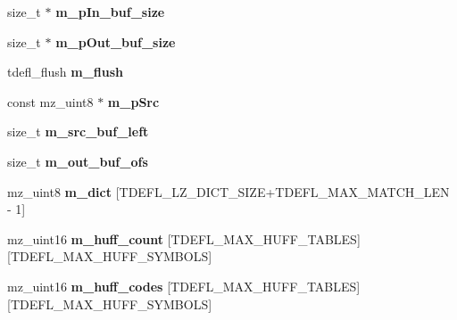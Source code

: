 \begin{DoxyCompactItemize}
size\+\_\+t $\ast$ {\bfseries m\+\_\+p\+In\+\_\+buf\+\_\+size}
\item 
\mbox{\label{structtdefl__compressor_a2629e9f8046f0d2d8898303ed6e50fbf}} 
size\+\_\+t $\ast$ {\bfseries m\+\_\+p\+Out\+\_\+buf\+\_\+size}
\item 
\mbox{\label{structtdefl__compressor_a8a3cce846b9849371735935790d8bab5}} 
tdefl\+\_\+flush {\bfseries m\+\_\+flush}
\item 
\mbox{\label{structtdefl__compressor_a2fe623583532f09b395e99e3d25c123e}} 
const mz\+\_\+uint8 $\ast$ {\bfseries m\+\_\+p\+Src}
\item 
\mbox{\label{structtdefl__compressor_a5405cb47173aa1c06cb7bb067a036f07}} 
size\+\_\+t {\bfseries m\+\_\+src\+\_\+buf\+\_\+left}
\item 
\mbox{\label{structtdefl__compressor_a9450656373de691c1e2606b272d4d6f6}} 
size\+\_\+t {\bfseries m\+\_\+out\+\_\+buf\+\_\+ofs}
\item 
\mbox{\label{structtdefl__compressor_a691c134da085a12b55d951709ce48525}} 
mz\+\_\+uint8 {\bfseries m\+\_\+dict} \mbox{[}T\+D\+E\+F\+L\+\_\+\+L\+Z\+\_\+\+D\+I\+C\+T\+\_\+\+S\+I\+ZE+T\+D\+E\+F\+L\+\_\+\+M\+A\+X\+\_\+\+M\+A\+T\+C\+H\+\_\+\+L\+EN -\/ 1\mbox{]}
\item 
\mbox{\label{structtdefl__compressor_ab77f4dbe0fa2167b4491a99fb9250fba}} 
mz\+\_\+uint16 {\bfseries m\+\_\+huff\+\_\+count} \mbox{[}T\+D\+E\+F\+L\+\_\+\+M\+A\+X\+\_\+\+H\+U\+F\+F\+\_\+\+T\+A\+B\+L\+ES\mbox{]}\mbox{[}T\+D\+E\+F\+L\+\_\+\+M\+A\+X\+\_\+\+H\+U\+F\+F\+\_\+\+S\+Y\+M\+B\+O\+LS\mbox{]}
\item 
\mbox{\label{structtdefl__compressor_a32dd7a7684f0408712fc2b2a2e97edba}} 
mz\+\_\+uint16 {\bfseries m\+\_\+huff\+\_\+codes} \mbox{[}T\+D\+E\+F\+L\+\_\+\+M\+A\+X\+\_\+\+H\+U\+F\+F\+\_\+\+T\+A\+B\+L\+ES\mbox{]}\mbox{[}T\+D\+E\+F\+L\+\_\+\+M\+A\+X\+\_\+\+H\+U\+F\+F\+\_\+\+S\+Y\+M\+B\+O\+LS\mbox{]}
\item 
\mbox{\label{structtdefl__compressor_ae77276d53c663acfa812990426d45197}} 

\end{DoxyCompactItemize}
